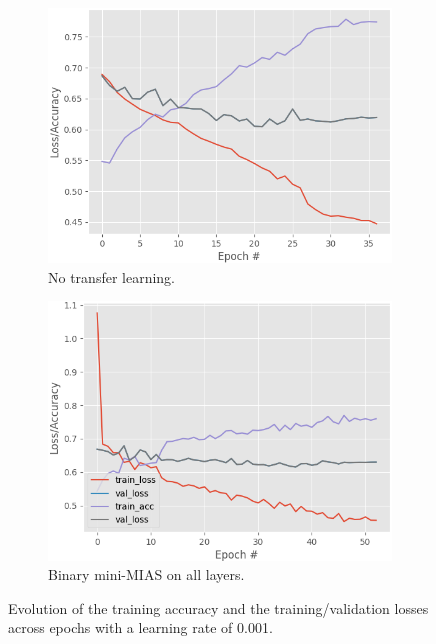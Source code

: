 \begin{figure}[h]
\centering
\begin{subfigure}{.5\textwidth}
  \centering
  \includegraphics[width=\textwidth]{figures/evaluation/individual/TL-none.png}
  \caption{No transfer learning.}
  \label{fig:evaluation-individual-TL-none}
\end{subfigure}%
\begin{subfigure}{.5\textwidth}
  \centering
  \includegraphics[width=\textwidth]{figures/evaluation/individual/TL-all.png}
  \caption{Binary mini-MIAS on all layers.}
  \label{fig:evaluation-individual-TL-all}
\end{subfigure}
\caption{\label{fig:evaluation-individual-TL-training}Evolution of the training accuracy and the training/validation losses across epochs with a learning rate of 0.001.}
\end{figure}

